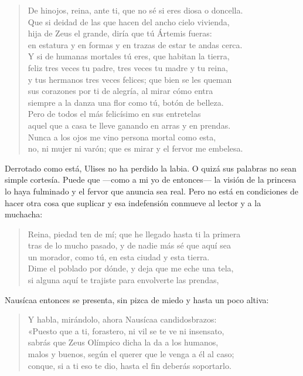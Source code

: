 \begin{verse}
De hinojos, reina, ante ti, que no sé si eres diosa o doncella.\\
Que si deidad de las que hacen del ancho cielo vivienda,\\
hija de Zeus el grande, diría que tú Ártemis fueras:\\
en estatura y en formas y en trazas de estar te andas cerca.\\
Y si de humanas mortales tú eres, que habitan la tierra,\\
feliz tres veces tu padre, tres veces tu madre y tu reina,\\
y tus hermanos tres veces felices; que bien se les queman\\
sus corazones por ti de alegría, al mirar cómo entra\\
siempre a la danza una flor como tú, botón de belleza.\\
Pero de todos el más felicísimo en sus entretelas\\
aquel que a casa te lleve ganando en arras y en prendas.\\
Nunca a los ojos me vino persona mortal como esta,\\
no, ni mujer ni varón; que es mirar y el fervor me embelesa.
\end{verse}

Derrotado como está, Ulises no ha perdido la labia. O quizá sus palabras no sean simple cortesía. Puede que ---como a mi yo de entonces--- la visión de la princesa lo haya fulminado y el fervor que anuncia sea real. Pero no está en condiciones de hacer otra cosa que suplicar y esa indefensión conmueve al lector y a la muchacha:

\begin{verse}
Reina, piedad ten de mí; que he llegado hasta ti la primera\\
tras de lo mucho pasado, y de nadie más sé que aquí sea\\
un morador, como tú, en esta ciudad y esta tierra.\\
Dime el poblado por dónde, y deja que me eche una tela,\\
si alguna aquí te trajiste para envolverte las prendas,
\end{verse}

Nausícaa entonces se presenta, sin pizca de miedo y hasta un poco altiva:

\begin{verse}
Y habla, mirándolo, ahora Nausícaa candidosbrazos:\\
«Puesto que a ti, forastero, ni vil se te ve ni insensato,\\
sabrás que Zeus Olímpico dicha la da a los humanos,\\
malos y buenos, según el querer que le venga a él al caso;\\
conque, si a ti eso te dio, hasta el fin deberás soportarlo.
\end{verse}

